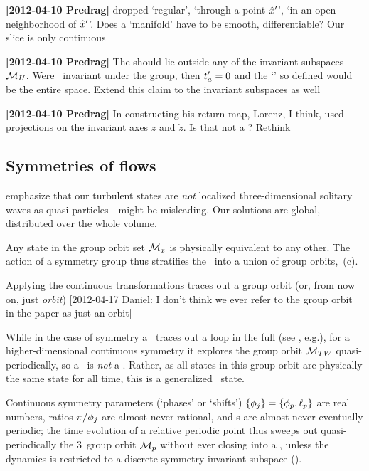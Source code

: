 {\bf [2012-04-10 Predrag]}
dropped `regular', `through a point ${\hat{x}'}$', `in an open neighborhood
of ${\hat{x}'}$'. Does a `manifold' have to be smooth, differentiable? Our
slice is only continuous


{\bf [2012-04-10 Predrag]}  \toCB
The {\template} should lie outside any of the invariant subspaces
${\cal M}_H$. Were \slicep\ invariant under the group, then $t'_{a}=0$
and the `\slice' so defined would be the entire space. Extend this claim
to the invariant subspaces as well

{\bf [2012-04-10 Predrag]}  \toCB
In constructing his return map, Lorenz, I think, used projections on the
invariant axes $z$ and $\dot{z}$. Is that not a \slice? Rethink

\subsection{Symmetries of flows}
\label{s:symmFL}

													\toCB
emphasize that our turbulent states are \emph{not} localized
three-dimensional solitary waves as quasi-particles -
 might be misleading. Our solutions are global,
distributed over the whole volume.

Any state in the  group orbit set ${\cal M}_{x}$ is physically equivalent
to any other. The action of a symmetry group thus stratifies the
\statesp\ into a union of group orbits, \,{(c)}.


Applying the continuous transformations traces out a {group orbit} (or,
from now on, just \emph{orbit}) [2012-04-17 Daniel: I don't think we ever
refer to the group orbit in the paper as just an orbit]

While in the case of  symmetry a \reqv\ traces out a loop in the
full \statesp (see , e.g.), for a
higher-dimensional continuous symmetry it explores the group orbit
${\cal M}_{TW_{}}$ quasi-periodically, so a \reqv\ is \emph{not} a \po.
Rather, as all states in this group orbit are physically the same state
for all time, this is a generalized \eqv\ state.

Continuous symmetry parameters (`phases' or `shifts')
$\{{\bf \phi}_j\}=\{\phi_p,\ell_p\}$ are real numbers, ratios
$\pi/{\bf \phi}_j$ are almost never rational, and \rpo s are almost never
eventually periodic; the time evolution of a relative periodic point thus
sweeps out quasi-periodically the $3$\dmn\ group orbit ${\cal M}_p$ without
ever closing into a \po, unless the dynamics is restricted to a
discrete-symmetry invariant subspace ().

